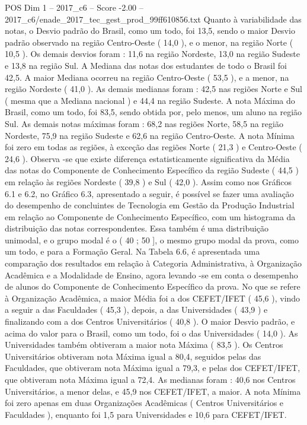\begin{textsample}{POS Dim 1 – 2017\_c6 – Score -2.00 – 2017\_c6/enade\_2017\_tec\_gest\_prod\_99ff610856.txt}
Quanto à variabilidade das notas, o Desvio padrão do Brasil, como um todo, foi 13,5, sendo o maior Desvio padrão observado na região Centro-Oeste ( 14,0 ), e o menor, na região Norte ( 10,5 ).
Os demais desvios foram : 11,6 na região Nordeste, 13,0 na região Sudeste e 13,8 na região Sul.
A Mediana das notas dos estudantes de todo o Brasil foi 42,5.
A maior Mediana ocorreu na região Centro-Oeste ( 53,5 ), e a menor, na região Nordeste ( 41,0 ).
As demais medianas foram : 42,5 nas regiões Norte e Sul ( mesma que a Mediana nacional ) e 44,4 na região Sudeste.
A nota Máxima do Brasil, como um todo, foi 83,5, sendo obtida por, pelo menos, um aluno na região Sul.
As demais notas máximas foram : 68,2 nas regiões Norte, 58,5 na região Nordeste, 75,9 na região Sudeste e 62,6 na região Centro-Oeste.
A nota Mínima foi zero em todas as regiões, à exceção das regiões Norte ( 21,3 ) e Centro-Oeste ( 24,6 ).
Observa -se que existe diferença estatisticamente significativa da Média das notas do Componente de Conhecimento Específico da região Sudeste ( 44,5 ) em relação às regiões Nordeste ( 39,8 ) e Sul ( 42,0 ).
Assim como nos Gráficos 6.1 e 6.2, no Gráfico 6.3, apresentado a seguir, é possível se fazer uma avaliação do desempenho de concluintes de Tecnologia em Gestão da Produção Industrial em relação ao Componente de Conhecimento Específico, com um histograma da distribuição das notas correspondentes.
Essa também é uma distribuição unimodal, e o grupo modal é o ( 40 ; 50 ], o mesmo grupo modal da prova, como um todo, e para a Formação Geral.
Na Tabela 6.6, é apresentada uma comparação dos resultados em relação à Categoria Administrativa, à Organização Acadêmica e a Modalidade de Ensino, agora levando -se em conta o desempenho de alunos do Componente de Conhecimento Específico da prova.
No que se refere à Organização Acadêmica, a maior Média foi a dos CEFET/IFET ( 45,6 ), vindo a seguir a das Faculdades ( 45,3 ), depois, a das Universidades ( 43,9 ) e finalizando com a dos Centros Universitários ( 40,8 ).
O maior Desvio padrão, e acima do valor para o Brasil, como um todo, foi o das Universidades ( 14,0 ).
As Universidades também obtiveram a maior nota Máxima ( 83,5 ).
Os Centros Universitários obtiveram nota Máxima igual a 80,4, seguidos pelas das Faculdades, que obtiveram nota Máxima igual a 79,3, e pelas dos CEFET/IFET, que obtiveram nota Máxima igual a 72,4.
As medianas foram : 40,6 nos Centros Universitários, a menor delas, e 45,9 nos CEFET/IFET, a maior.
A nota Mínima foi zero apenas em duas Organizações Acadêmicas ( Centros Universitários e Faculdades ), enquanto foi 1,5 para Universidades e 10,6 para CEFET/IFET.

\end{textsample}

